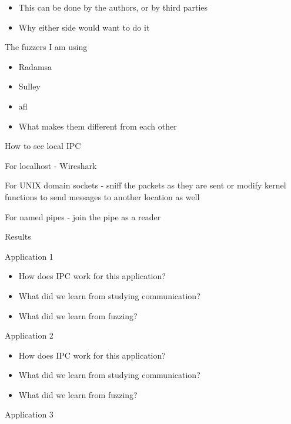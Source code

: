 \documentclass{article}
\begin{document}
\begin{outline}
\begin{outline}
\begin{outline}
\begin{itemize}
                \item This can be done by the authors, or by third parties
                \item Why either side would want to do it
            \end{itemize}
            \item The fuzzers I am using
            \begin{itemize}
                \item Radamsa
                \item Sulley
                \item afl
                \item What makes them different from each other
            \end{itemize}
        \end{outline}
        \item How to see local IPC
        \begin{outline}
            \item For localhost - Wireshark
            \item For UNIX domain sockets - sniff the packets as they are sent or modify kernel functions to send messages to another location as well
            \item For named pipes - join the pipe as a reader
        \end{outline}
    \end{outline}
    \item Results
    \begin{outline}
        \item Application 1
        \begin{itemize}
            \item How does IPC work for this application?
            \item What did we learn from studying communication?
            \item What did we learn from fuzzing?
        \end{itemize}
        \item Application 2
        \begin{itemize}
            \item How does IPC work for this application?
            \item What did we learn from studying communication?
            \item What did we learn from fuzzing?
        \end{itemize}
        \item Application 3

\end{outline}
\end{outline}
\end{document}
